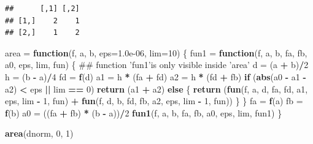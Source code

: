 \documentclass[11pt,]{krantz}
\makeatletter
\newenvironment{Shaded}{\begin{snugshade}}{\end{snugshade}}
\newcommand{\KeywordTok}[1]{\textcolor[rgb]{0.13,0.29,0.53}{\textbf{#1}}}
\newcommand{\DataTypeTok}[1]{\textcolor[rgb]{0.13,0.29,0.53}{#1}}
\newcommand{\DecValTok}[1]{\textcolor[rgb]{0.00,0.00,0.81}{#1}}
\newcommand{\FloatTok}[1]{\textcolor[rgb]{0.00,0.00,0.81}{#1}}
\newcommand{\StringTok}[1]{\textcolor[rgb]{0.31,0.60,0.02}{#1}}
\newcommand{\ControlFlowTok}[1]{\textcolor[rgb]{0.13,0.29,0.53}{\textbf{#1}}}
\newcommand{\OperatorTok}[1]{\textcolor[rgb]{0.81,0.36,0.00}{\textbf{#1}}}
\newcommand{\NormalTok}[1]{#1}
\newenvironment{kframe}{%
\medskip{}
\setlength{\fboxsep}{.8em}
 \def\at@end@of@kframe{}%
 \ifinner\ifhmode%
  \def\at@end@of@kframe{\end{minipage}}%
  \begin{minipage}{\columnwidth}%
 \fi\fi%
 \def\FrameCommand##1{\hskip\@totalleftmargin \hskip-\fboxsep
 \colorbox{shadecolor}{##1}\hskip-\fboxsep
     \hskip-\linewidth \hskip-\@totalleftmargin \hskip\columnwidth}%
 \MakeFramed {\advance\hsize-\width
   \@totalleftmargin\z@ \linewidth\hsize
   \@setminipage}}%
 {\par\unskip\endMakeFramed%
 \at@end@of@kframe}
\renewenvironment{Shaded}{\begin{kframe}}{\end{kframe}}
\theoremstyle{definition}
\theoremstyle{definition}
\theoremstyle{remark}
\makeatother
\begin{document}
\begin{verbatim}
##      [,1] [,2]
## [1,]    2    1
## [2,]    1    2
\end{verbatim}

\begin{Shaded}
\begin{Highlighting}[]
\NormalTok{area =}\StringTok{ }\ControlFlowTok{function}\NormalTok{(f, a, b, }\DataTypeTok{eps=}\FloatTok{1.0e-06}\NormalTok{, }\DataTypeTok{lim=}\DecValTok{10}\NormalTok{) }
\NormalTok{\{}
\NormalTok{  fun1 =}\StringTok{ }\ControlFlowTok{function}\NormalTok{(f, a, b, fa, fb, a0, eps, lim, fun) }
\NormalTok{  \{}
\NormalTok{  ## function 'fun1'is only visible inside 'area'}
\NormalTok{    d =}\StringTok{ }\NormalTok{(a }\OperatorTok{+}\StringTok{ }\NormalTok{b)}\OperatorTok{/}\DecValTok{2}
\NormalTok{    h =}\StringTok{ }\NormalTok{(b }\OperatorTok{-}\StringTok{ }\NormalTok{a)}\OperatorTok{/}\DecValTok{4}
\NormalTok{    fd =}\StringTok{ }\KeywordTok{f}\NormalTok{(d)}
\NormalTok{    a1 =}\StringTok{ }\NormalTok{h }\OperatorTok{*}\StringTok{ }\NormalTok{(fa }\OperatorTok{+}\StringTok{ }\NormalTok{fd)}
\NormalTok{    a2 =}\StringTok{ }\NormalTok{h }\OperatorTok{*}\StringTok{ }\NormalTok{(fd }\OperatorTok{+}\StringTok{ }\NormalTok{fb)}
    \ControlFlowTok{if}\NormalTok{ (}\KeywordTok{abs}\NormalTok{(a0 }\OperatorTok{-}\StringTok{ }\NormalTok{a1 }\OperatorTok{-}\StringTok{ }\NormalTok{a2) }\OperatorTok{<}\StringTok{ }\NormalTok{eps }\OperatorTok{||}\StringTok{ }\NormalTok{lim }\OperatorTok{==}\StringTok{ }\DecValTok{0}\NormalTok{)}
      \KeywordTok{return}\NormalTok{ (a1 }\OperatorTok{+}\StringTok{ }\NormalTok{a2)}
    \ControlFlowTok{else}\NormalTok{ \{}
      \KeywordTok{return}\NormalTok{ (}\KeywordTok{fun}\NormalTok{(f, a, d, fa, fd, a1, eps, lim }\OperatorTok{-}\StringTok{ }\DecValTok{1}\NormalTok{, fun) }\OperatorTok{+}\StringTok{ }\KeywordTok{fun}\NormalTok{(f, d, b, fd, fb, a2, eps, lim }\OperatorTok{-}\StringTok{ }\DecValTok{1}\NormalTok{, fun))}
\NormalTok{    \}}
\NormalTok{  \}}
\NormalTok{  fa =}\StringTok{ }\KeywordTok{f}\NormalTok{(a)}
\NormalTok{  fb =}\StringTok{ }\KeywordTok{f}\NormalTok{(b)}
\NormalTok{  a0 =}\StringTok{ }\NormalTok{((fa }\OperatorTok{+}\StringTok{ }\NormalTok{fb) }\OperatorTok{*}\StringTok{ }\NormalTok{(b }\OperatorTok{-}\StringTok{ }\NormalTok{a))}\OperatorTok{/}\DecValTok{2}
  \KeywordTok{fun1}\NormalTok{(f, a, b, fa, fb, a0, eps, lim, fun1)}
\NormalTok{\} }

\KeywordTok{area}\NormalTok{(dnorm, }\DecValTok{0}\NormalTok{, }\DecValTok{1}\NormalTok{)}
\end{Highlighting}
\end{Shaded}
\end{document}
